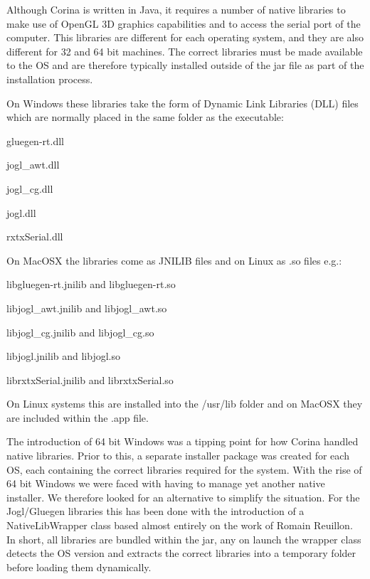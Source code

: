 Although Corina is written in Java, it requires a number of native libraries to make use of OpenGL 3D graphics capabilities and to access the serial port of the computer.  This libraries are different for each operating system, and they are also different for 32 and 64 bit machines.  The correct libraries must be made available to the OS and are therefore typically installed outside of the jar file as part of the installation process.  

On Windows these libraries take the form of Dynamic Link Libraries (DLL) files which are normally placed in the same folder as the executable:

\begin{itemize*}
 \item gluegen-rt.dll
 \item jogl\_awt.dll
 \item jogl\_cg.dll
 \item jogl.dll
 \item rxtxSerial.dll
\end{itemize*}

On MacOSX the libraries come as JNILIB files and on Linux as .so files e.g.:

\begin{itemize*}
 \item libgluegen-rt.jnilib and libgluegen-rt.so
 \item libjogl\_awt.jnilib and libjogl\_awt.so
 \item libjogl\_cg.jnilib and libjogl\_cg.so
 \item libjogl.jnilib and libjogl.so
 \item librxtxSerial.jnilib and librxtxSerial.so
\end{itemize*}

On Linux systems this are installed into the /usr/lib folder and on MacOSX they are included within the .app file.

The introduction of 64 bit Windows was a tipping point for how Corina handled native libraries.  Prior to this, a separate installer package was created for each OS, each containing the correct libraries required for the system.  With the rise of 64 bit Windows we were faced with having to manage yet another native installer.  We therefore looked for an alternative to simplify the situation.  For the Jogl/Gluegen libraries this has been done with the introduction of a NativeLibWrapper class based almost entirely on the work of Romain Reuillon.  In short, all libraries are bundled within the jar, any on launch the wrapper class detects the OS version and extracts the correct libraries into a temporary folder before loading them dynamically.  

